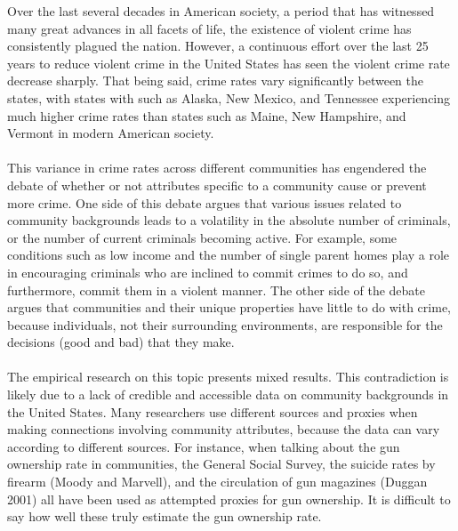 \documentclass[letterpaper, 11 pt, conference]{article}
\begin{document}
Over the last several decades in American society, a period that has witnessed many great advances in all facets of life, the existence of violent crime has consistently plagued the nation. However, a continuous effort over the last 25 years to reduce violent crime in the United States has seen the violent crime rate decrease sharply. That being said, crime rates vary significantly between the states, with states with such as Alaska, New Mexico, and Tennessee experiencing much higher crime rates than states such as Maine, New Hampshire, and Vermont in modern American society.
\\
\\This variance in crime rates across different communities has engendered the debate of whether or not attributes specific to a community cause or prevent more crime. One side of this debate argues that various issues related to community backgrounds leads to a volatility in the absolute number of criminals, or the number of current criminals becoming active. For example, some conditions such as low income and the number of single parent homes play a role in encouraging criminals who are inclined to commit crimes to do so, and furthermore, commit them in a violent manner. The other side of the debate argues that communities and their unique properties have little to do with crime, because individuals, not their surrounding environments, are responsible for the decisions (good and bad) that they make.
\\
\\The empirical research on this topic presents mixed results. This contradiction is likely due to a lack of credible and accessible data on community backgrounds in the United States. Many researchers use different sources and proxies when making connections involving community attributes, because the data can vary according to different sources. For instance, when talking about the gun ownership rate in communities, the General Social Survey, the suicide rates by firearm (Moody and Marvell), and the circulation of gun magazines (Duggan 2001) all have been used as attempted proxies for gun ownership. It is difficult to say how well these truly estimate the gun ownership rate.
\\
\end{document}
